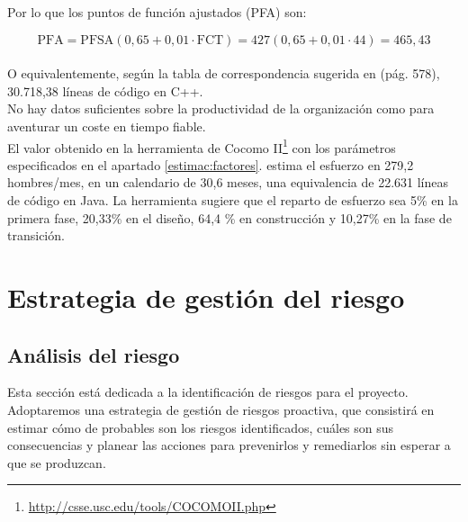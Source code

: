 \documentclass[11pt, a4paper, twoside, titlepage]{article}
\begin{document}
		Por lo que los puntos de función ajustados (PFA) son:

	\begin{equation}
		\mathrm{PFA} = \mathrm{PFSA} (0,65 + 0,01 \cdot \mathrm{FCT}) = 427 (0,65 + 0,01 \cdot 44) = 465,43 \tag{PFA}
	\end{equation}\\

		O equivalentemente, según la tabla de correspondencia sugerida en \cite{PSMAN} (pág. 578), 30.718,38 líneas de código en C++.\\

		No hay datos suficientes sobre la productividad de la organización como para aventurar un coste en tiempo fiable.\\

		El valor obtenido en la herramienta de Cocomo II\footnote{\url{http://csse.usc.edu/tools/COCOMOII.php}} con los parámetros especificados en el apartado \ref{estimac:factores}. estima el esfuerzo en 279,2 hombres/mes, en un calendario de 30,6 meses, una equivalencia de 22.631 líneas de código en Java. La herramienta sugiere que el reparto de esfuerzo sea 5\% en la primera fase, 20,33\% en el diseño, 64,4 \% en construcción y 10,27\% en la fase de transición.
			
	\section{Estrategia de gestión del riesgo}
		\subsection{Análisis del riesgo}
		Esta sección está dedicada a la identificación de riesgos para el proyecto. Adoptaremos una estrategia de gestión de riesgos proactiva, que consistirá en estimar cómo de probables son los riesgos identificados, cuáles son sus consecuencias y planear las acciones para prevenirlos y remediarlos sin esperar a que se produzcan.\\
		
\end{document}
